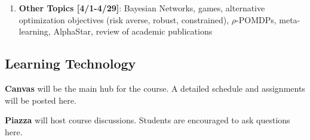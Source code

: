 \documentclass[9pt]{article}
\begin{document}
\begin{enumerate}[noitemsep]
\begin{multicols}{2}
\begin{itemize}[noitemsep]
            \item Bayesian filters
            \item Particle filters
            \item Partially observable Markov decision processes (POMDPs)
            \item Exact POMDP methods
            \item Offline POMDP methods
            \item Online POMDP methods
            \item QMDP
        \end{itemize}
        \end{multicols}
    \item \textbf{Other Topics [4/1-4/29]}: Bayesian Networks, games, alternative optimization objectives (risk averse, robust, constrained), $\rho$-POMDPs, meta-learning, AlphaStar, review of academic publications
\end{enumerate}

\begin{samepage}
\section*{Learning Technology}

\textbf{Canvas} will be the main hub for the course. A detailed schedule and assignments will be posted here.

\textbf{Piazza} will host course discussions. Students are encouraged to ask questions here.
\end{samepage}
\\
\end{document}

